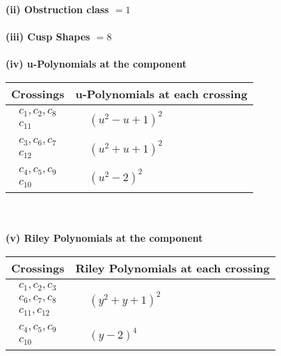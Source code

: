 \documentclass[1p]{elsarticle_modified}
\theoremstyle{definition}
\begin{document}
\flushleft \textbf{(ii) Obstruction class $= 1$}\\~\\
\flushleft \textbf{(iii) Cusp Shapes $= 8$}\\~\\
\newpage\renewcommand{\arraystretch}{1}
\flushleft \textbf{(iv) u-Polynomials at the component}\newline \\
\begin{tabular}{m{50pt}|m{274pt}}
Crossings & \hspace{64pt}u-Polynomials at each crossing \\
\hline $$\begin{aligned}c_{1},c_{2},c_{8}\\c_{11}\end{aligned}$$&$\begin{aligned}
&(u^2- u+1)^2
\end{aligned}$\\
\hline $$\begin{aligned}c_{3},c_{6},c_{7}\\c_{12}\end{aligned}$$&$\begin{aligned}
&(u^2+u+1)^2
\end{aligned}$\\
\hline $$\begin{aligned}c_{4},c_{5},c_{9}\\c_{10}\end{aligned}$$&$\begin{aligned}
&(u^2-2)^2
\end{aligned}$\\
\hline
\end{tabular}\\~\\
\newpage\renewcommand{\arraystretch}{1}
\flushleft \textbf{(v) Riley Polynomials at the component}\newline \\
\begin{tabular}{m{50pt}|m{274pt}}
Crossings & \hspace{64pt}Riley Polynomials at each crossing \\
\hline $$\begin{aligned}c_{1},c_{2},c_{3}\\c_{6},c_{7},c_{8}\\c_{11},c_{12}\end{aligned}$$&$\begin{aligned}
&(y^2+y+1)^2
\end{aligned}$\\
\hline $$\begin{aligned}c_{4},c_{5},c_{9}\\c_{10}\end{aligned}$$&$\begin{aligned}
&(y-2)^4
\end{aligned}$\\
\hline
\end{tabular}\\~\\
\end{document}
